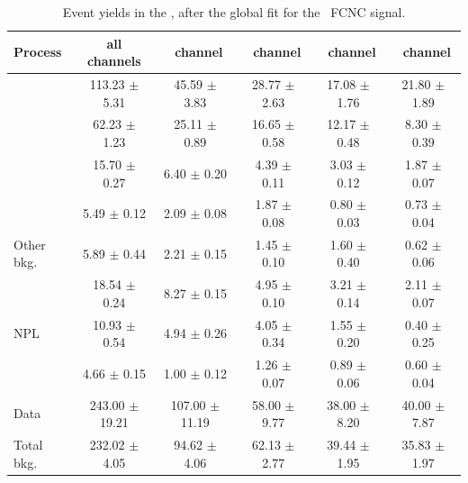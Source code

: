 \begin{landscape}
	\vspace*{\fill}
	
	\begin{table}[htbp]
		\centering
		\caption{Event yields in the \TTSR, after the global fit for the \Zut\ FCNC signal.  }	
		\begin{tabular} {l c c c c c}
			\toprule
			Process & all channels & \mumumu\ channel & \emumu\ channel & \eemu\ channel &\eee\ channel \\
			\midrule
			\NPL\ \DY  		& 113.23 $ \pm $  5.31 & 45.59 $\pm$  3.83 & 28.77 $\pm$  2.63 & 17.08 $\pm$ 1.76 & 21.80 $\pm$ 1.89 \\ 
			\ttZ 			&  62.23 $ \pm $  1.23 & 25.11 $\pm$  0.89 & 16.65 $\pm$  0.58 & 12.17 $\pm$ 0.48 &  8.30 $\pm$ 0.39 \\ 
			\WZ 			&  15.70 $ \pm $  0.27 &  6.40 $\pm$  0.20 &  4.39 $\pm$  0.11 &  3.03 $\pm$ 0.12 &  1.87 $\pm$ 0.07 \\ 
			\ZZ 			&   5.49 $ \pm $  0.12 &  2.09 $\pm$  0.08 &  1.87 $\pm$  0.08 & 0.80 $\pm$ 0.03 &  0.73 $\pm$ 0.04 \\ 
			Other bkg. 		&   5.89 $ \pm $  0.44 &  2.21 $\pm$  0.15 &  1.45 $\pm$  0.10 & 1.60 $\pm$ 0.40 &  0.62 $\pm$ 0.06\\ 
			\tZq 			&  18.54 $ \pm $  0.24 &  8.27 $\pm$  0.15 &  4.95 $\pm$  0.10 & 3.21 $\pm$ 0.14 &  2.11 $\pm$ 0.07\\ 
			NPL \ttbar      &   10.93 $ \pm $ 0.54 &  4.94 $\pm$  0.26 &  4.05 $\pm$  0.34 & 1.55 $\pm$ 0.20 &  0.40 $\pm$ 0.25 \B\\
			\hdashline
			\kZut  			&   4.66 $ \pm $  0.15 &  1.00 $\pm$  0.12 &  1.26 $\pm$  0.07 & 0.89 $\pm$ 0.06 &  0.60 $\pm$ 0.04 \T\B\\
			\hdashline
			Data 			& 243.00 $ \pm $ 19.21 & 107.00 $\pm$ 11.19 & 58.00 $\pm$ 9.77 & 38.00 $\pm$ 8.20 & 40.00 $\pm$ 7.87 \T \\
			Total bkg. 	& 232.02 $ \pm $  4.05 &  94.62 $\pm$  4.06 & 62.13 $\pm$ 2.77 & 39.44 $\pm$ 1.95 & 35.83 $\pm$ 1.97 \\
			\bottomrule
		\end{tabular}
		\label{tab:PYieldTTSR}
	\end{table}
	
	
	\vspace*{\fill}
\end{landscape}
